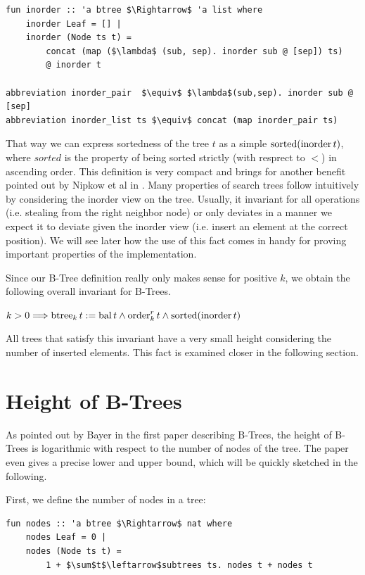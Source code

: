 \begin{lstlisting}[mathescape=true, language=Isabelle]
fun inorder :: 'a btree $\Rightarrow$ 'a list where
    inorder Leaf = [] |
    inorder (Node ts t) = 
        concat (map ($\lambda$ (sub, sep). inorder sub @ [sep]) ts)
        @ inorder t

abbreviation inorder_pair  $\equiv$ $\lambda$(sub,sep). inorder sub @ [sep]
abbreviation inorder_list ts $\equiv$ concat (map inorder_pair ts)
\end{lstlisting}

That way we can express sortedness of the tree $t$ as a simple $\operatorname{sorted} (\operatorname{inorder} t)$,
where $sorted$ is the property of being sorted strictly (with resprect to $<$)
in ascending order.
This definition is very compact and brings for another benefit
pointed out by Nipkow et al in \parencite{DBLP:conf/itp/Nipkow16}.
Many properties of search trees follow intuitively by considering
the inorder view on the tree.
Usually, it invariant for all operations (i.e. stealing from the right neighbor node)
or only deviates in a manner we expect it to deviate given the inorder view
(i.e. insert an element at the correct position).
We will see later how the use of this fact comes in handy for proving
important properties of the implementation.

Since our B-Tree definition really only makes sense for positive $k$,
we obtain the following overall invariant for B-Trees.

\begin{definition}
    $k > 0 \Longrightarrow \operatorname{btree}_k t := \operatorname{bal} t \wedge \operatorname{order}^r_k t \wedge \operatorname{sorted} (\operatorname{inorder} t)$
\end{definition}

All trees that satisfy this invariant have a very small
height considering the number of inserted elements.
This fact is examined closer in the following section.

\section{Height of B-Trees}

As pointed out by Bayer in the first paper describing B-Trees,
the height of B-Trees is logarithmic with respect to the number
of nodes of the tree. \parencite{DBLP:journals/acta/BayerM72}
The paper even gives a precise lower and upper bound,
which will be quickly sketched in the following.

First, we define the number of nodes in a tree:
\begin{lstlisting}[mathescape=true, language=Isabelle]
fun nodes :: 'a btree $\Rightarrow$ nat where
    nodes Leaf = 0 |
    nodes (Node ts t) =
        1 + $\sum$t$\leftarrow$subtrees ts. nodes t + nodes t
\end{lstlisting}

